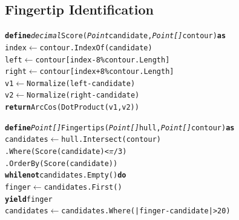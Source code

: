 \documentclass[12pt]{article}
\begin{document}
\newpage
\subsection{Fingertip Identification}
\begin{small}
\begin{alltt}
\textbf{define} \textit{decimal} Score(\textit{Point} candidate, \textit{Point[]} contour) \textbf{as}
    index \(\leftarrow\) contour.IndexOf(candidate)
    left \(\leftarrow\) contour[index - 8 \% contour.Length]
    right \(\leftarrow\) contour[index + 8 \% contour.Length]
    v1 \(\leftarrow\) Normalize(left - candidate)
    v2 \(\leftarrow\) Normalize(right - candidate)
    \textbf{return} ArcCos(DotProduct(v1, v2))

\textbf{define} \textit{Point[]} Fingertips(\textit{Point[]} hull, \textit{Point[]} contour) \textbf{as}
    candidates \(\leftarrow\) hull.Intersect(contour)
                      .Where(Score(candidate) < \(\pi\) / 3)
                      .OrderBy(Score(candidate))
    \textbf{while not} candidates.Empty() \textbf{do}
        finger \(\leftarrow\) candidates.First()
        \textbf{yield} finger
        candidates \(\leftarrow\) candidates.Where(|finger - candidate| > 20)
\end{alltt}
\end{small}
\end{document}
